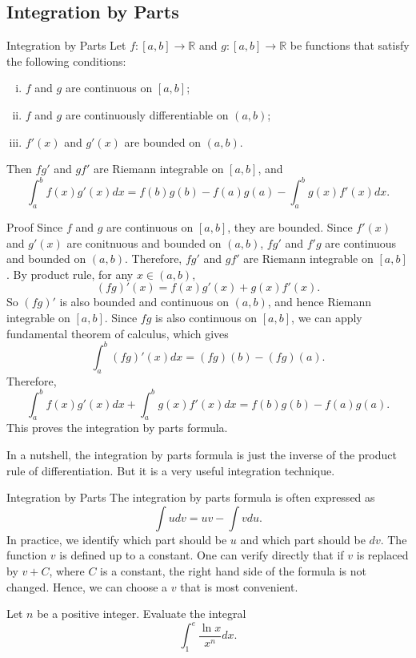 \begin{example}[label=20230527]{}
\subsection{Integration by Parts}

\begin{theorem}{Integration by Parts}
Let $f:[a,b]\to\mathbb{R}$ and $g:[a,b]\to\mathbb{R}$ be  functions that satisfy the following conditions:
\begin{enumerate}[(i)]
\item $f$ and $g$ are continuous on $[a,b]$;
\item $f$ and $g$ are  continuously differentiable on $(a,b)$;
\item $f'(x)$ and $g'(x)$ are bounded on $(a,b)$.
\end{enumerate}Then $fg'$ and $gf'$ are Riemann integrable on $[a,b]$, and
\[\int_a^b f(x)g'(x)dx=f(b)g(b)-f(a)g(a)-\int_a^bg(x) f'(x)dx.\]
\end{theorem}
\begin{myproof}{Proof}
Since  $f$ and $g$ are continuous on $[a,b]$, they are bounded. Since $f'(x)$ and $g'(x)$ are conitnuous and bounded on $(a,b)$, $fg'$ and $f'g$ are continuous and bounded on $(a,b)$. Therefore, $fg'$ and $gf'$ are Riemann integrable on $[a,b]$. By product rule, for any $x\in (a,b)$, 
\[(fg)'(x)=f(x)g'(x)+g(x)f'(x).\]
So $(fg)'$ is also bounded and continuous on $(a,b)$, and hence Riemann integrable on $[a,b]$. Since $fg$ is also continuous on $[a,b]$, we can apply  fundamental theorem of calculus, which gives
\[\int_a^b (fg)'(x)dx=(fg)(b)-(fg)(a).\]
Therefore,
\[\int_a^b f(x)g'(x)dx+\int_a^b g(x)f'(x)dx= f(b)g(b)-f(a)g(a).\]This proves the integration by parts formula.
\end{myproof}In a nutshell, the integration by parts formula is just the inverse of the product rule of differentiation. But it is a very useful integration technique.
\begin{highlight}{Integration by Parts}
The integration by parts formula is often expressed as
\[\int udv=uv-\int vdu.\]
In practice, we  identify which part should be $u$ and which part should be $dv$. The function $v$ is defined up to a constant.  One can verify directly that if $v$ is replaced by $v+C$, where $C$ is a constant, the right hand side of the formula is not changed. Hence, we can choose a $v$ that is most convenient.
\end{highlight}

\begin{example}{}
Let $n$ be a positive integer. Evaluate the integral
\[\int_1^e\frac{\ln x}{x^n}dx.\]


\end{example}
\end{example}
